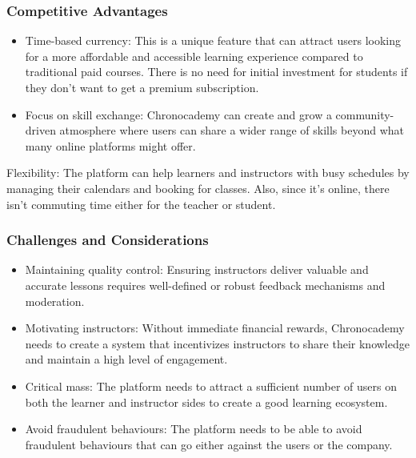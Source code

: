 \subsubsection{Competitive Advantages}
\begin{itemize}
    \item Time-based currency: This is a unique feature that can attract users looking for a more affordable and accessible learning experience compared to traditional paid courses.
    There is no need for initial investment for students if they don’t want to get a premium subscription.
    \item Focus on skill exchange: Chronocademy can create and grow a community-driven atmosphere where users can share a wider range of skills beyond what many online platforms might offer.
\end{itemize}
Flexibility: The platform can help learners and instructors with busy schedules by managing their calendars and booking for classes.
Also, since it’s online, there isn’t commuting time either for the teacher or student.

\subsubsection{Challenges and Considerations}
\begin{itemize}
    \item Maintaining quality control: Ensuring instructors deliver valuable and accurate lessons requires well-defined or robust feedback mechanisms and moderation.
    \item Motivating instructors: Without immediate financial rewards, Chronocademy needs to create a system that incentivizes instructors to share their knowledge and maintain a high level of engagement.
    \item Critical mass: The platform needs to attract a sufficient number of users on both the learner and instructor sides to create a good learning ecosystem.
    \item Avoid fraudulent behaviours: The platform needs to be able to avoid fraudulent behaviours that can go either against the users or the company.
\end{itemize}

